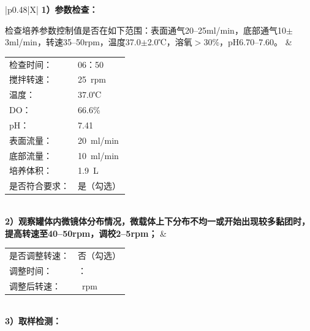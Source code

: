 \documentclass[UTF8,10pt,a4paper,fontset=fandol]{ctexart}
\newcommand{\fieldvalue}[1]{#1}
\newcommand{\handwritten}[1]{#1}
\begin{document}
\begin{tabularx}{\textwidth}{|p{}|X|}
\hline
\textbf{1）参数检查：}

检查培养参数控制值是否在如下范围：表面通气20--25ml/min，底部通气10$\pm$3ml/min，转速35--50rpm，温度37.0$\pm$2.0℃，溶氧$>$30\%，pH6.70--7.60。
&
\begin{tabular}{@{}ll@{}}
检查时间：&
\fieldvalue{\handwritten{06：50}}\\
搅拌转速：&
\fieldvalue{\handwritten{25}}\ rpm\\
温度：&
\fieldvalue{\handwritten{37.0}}℃\\
DO：&
\fieldvalue{\handwritten{66.6}}\%\\
pH：&
\fieldvalue{\handwritten{7.41}}\\
表面流量：&
\fieldvalue{\handwritten{20}}\ ml/min\\
底部流量：&
\fieldvalue{\handwritten{10}}\ ml/min\\
培养体积：&
\fieldvalue{\handwritten{1.9}}\ L\\
是否符合要求：&
\fieldvalue{\handwritten{是（勾选）}}
\end{tabular}
\\
\hline
\textbf{2）观察罐体内微镜体分布情况，微载体上下分布不均一或开始出现较多黏团时，提高转速至40--50rpm，调校2--5rpm；}
&
\begin{tabular}{@{}ll@{}}
是否调整转速：&
\fieldvalue{\handwritten{否（勾选）}}\\
调整时间：&\underline{\hspace{25mm}}：\underline{\hspace{15mm}}\\
调整后转速：&\underline{\hspace{35mm}}\ rpm
\end{tabular}
\\
\hline
\textbf{3）取样检测：}


\end{tabularx}
\end{document}
